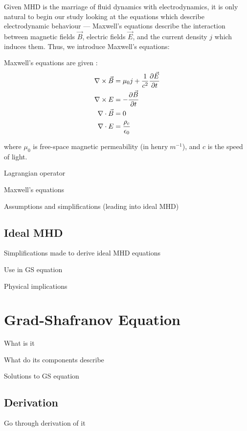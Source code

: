 Given MHD is the marriage of fluid dynamics with electrodynamics, it is only natural to begin our 
study looking at the equations which describe electrodynamic behaviour --- Maxwell's equations 
describe the interaction between magnetic fields $\vec{B}$, electric fields $\vec{E}$, and 
the current density $j$ which induces them. Thus, we introduce Maxwell's equations:
\begin{definition}
    Maxwell's equations are given \cite{wesson-tokamaks}:
    \begin{align}
        \nabla \times \vec{B} &= \mu_0 j + \frac{1}{c^2} \pdv{\vec{E}}{t} \\
        \nabla \times E &= -\pdv{\vec{B}}{t} \\
        \nabla \cdot \vec{B} &= 0 \\
        \nabla \cdot E &= \frac{\rho_c}{\epsilon_0}
    \end{align}

    where $\mu_0$ is free-space magnetic permeability (in $\text{henry}\; m^{-1}$), and $c$ is the speed of light.
    
\end{definition}

Lagrangian operator

Maxwell's equations

Assumptions and simplifications (leading into ideal MHD)

\subsection{Ideal MHD}

Simplifications made to derive ideal MHD equations 

Use in GS equation 

Physical implications

\section{Grad-Shafranov Equation}

What is it

What do its components describe

Solutions to GS equation 

\subsection{Derivation}

Go through derivation of it 

